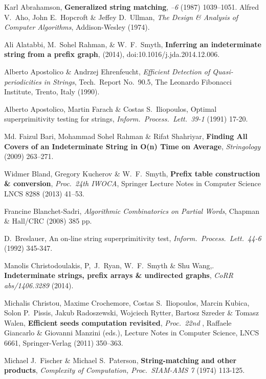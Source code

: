 \documentclass[runningheads,a4paper]{llncs}
\begin{document}
\begin{thebibliography}{99}
 Karl Abrahamson,
{\bf Generalized string matching}, {\it {}--6} (1987)
1039--1051.
 Alfred V.\ Aho, John E.\ Hopcroft \& Jeffey D.\ Ullman,
{\it The Design \& Analysis of Computer Algorithms},
Addison-Wesley (1974).

 Ali Alatabbi, M.\ Sohel Rahman, \& W.\ F.\ Smyth,
{\bf Inferring an indeterminate string from a prefix graph}, {\it \JDA} (2014),
doi:10.1016/j.jda.2014.12.006.

 Alberto Apostolico \& Andrzej Ehrenfeucht,
{\it Efficient Detection of Quasi-periodicities in Strings}, Tech.\ Report
No.\ 90.5, The Leonardo Fibonacci Institute, Trento, Italy (1990).

 Alberto Apostolico, Martin Farach \& Costas S.\ Iliopoulos,
Optimal superprimitivity testing for strings, {\it Inform.\ Process.\ Lett.\ 39-1}
(1991) 17-20.

 Md. Faizul Bari, Mohammad Sohel Rahman \& Rifat Shahriyar, 
{\bf Finding All Covers of an Indeterminate String in O(n) Time on Average}, {\it Stringology} (2009) 263--271.

 Widmer Bland, Gregory Kucherov \& W.\ F.\ Smyth,
{\bf Prefix table construction \& conversion},
{\it Proc.\ 24th IWOCA},
Springer Lecture Notes in Computer Science LNCS 8288 (2013) 41--53.

 Francine Blanchet-Sadri,
{\it Algorithmic Combinatorics on Partial Words},
Chapman \& Hall/CRC (2008) 385 pp.

 D.\ Breslauer,
An on-line string superprimitivity test, {\it Inform.\ Process.\ Lett.\ 44-6} (1992) 345-347.

 Manolis Christodoulakis, P,\ J.\ Ryan, W.\ F.\ Smyth \& Shu Wang,.
{\bf Indeterminate strings, prefix arrays \& undirected graphs},
{\it CoRR abs/1406.3289} (2014).

 Michalis Christou, Maxime Crochemore, Costas S.\ Iliopoulos, Marcin Kubica, Solon P.\ Pissis, Jakub Radoszewski, Wojciech Rytter, Bartosz Szreder \& Tomasz Walen,
{\bf Efficient seeds computation revisited},
{\it Proc.\ 22nd \CPM}, Raffaele Giancarlo \& Giovanni Manzini (eds.),
Lecture Notes in Computer Science, LNCS 6661, Springer-Verlag (2011) 350--363.

 Michael J.\ Fischer \& Michael S.\ Paterson,
{\bf String-matching and other products},
{\it Complexity of Computation, Proc.\ SIAM-AMS 7} (1974) 113-125.


\end{thebibliography}
\end{document}
